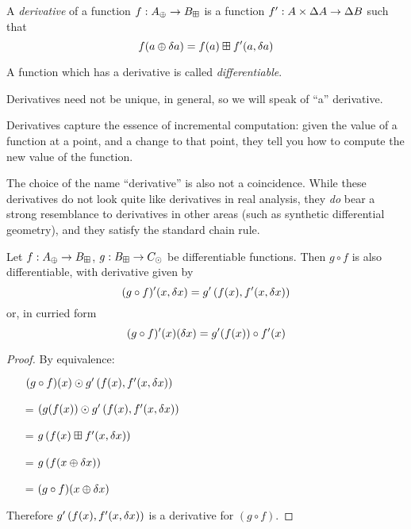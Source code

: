 \begin{defn}[Derivatives]
  A \textit{derivative} of a function $f: A_\oplus \rightarrow B_\boxplus$ is a function $f': A \times \Delta A \rightarrow
  \Delta B$ such that
  $$f(a \oplus \delta a) = f(a) \boxplus f'(a, \delta a)$$

  A function which has a derivative is called \textit{differentiable}.
\end{defn}

Derivatives need not be unique, in general, so we will speak of ``a''
derivative. 

Derivatives capture the essence of incremental computation: given the value of a
function at a point, and a change to that point, they tell you how to compute
the new value of the function.

The choice of the name ``derivative'' is also not a coincidence. While these
derivatives do not look quite like derivatives in real analysis, they \emph{do}
bear a strong resemblance to derivatives in other areas (such as synthetic differential geometry), and
they satisfy the standard chain rule.

\begin{thm}
  Let $f: A_\oplus \rightarrow B_\boxplus$, $g: B_\boxplus \rightarrow C_\odot$ be differentiable functions. Then $g \circ f$ is also
  differentiable, with derivative given by
   $$(g \circ f)'(x, \delta x) = g'\left(f(x), f'(x, \delta x)\right)$$
   or, in curried form
   $$(g \circ f)'(x)(\delta x) = g'(f(x)) \circ f'(x)$$
\end{thm}
\begin{proof}
  By equivalence:
  \begin{itemize}
    \item[ ]$(g \circ f)(x) \odot g'\left(f(x), f'(x,\delta x)\right)$
    \item[=]$(g(f(x)) \odot g'\left(f(x), f'(x,\delta x)\right)$
    \item[=]$g\left(f(x) \boxplus f'(x, \delta x) \right)$
    \item[=]$g\left(f(x \oplus \delta x)\right)$
    \item[=]$(g \circ f)(x \oplus \delta x)$
  \end{itemize}
  Therefore $g'\left(f(x), f'(x, \delta x)\right)$ is a
  derivative for $(g \circ f)$.
\end{proof}

